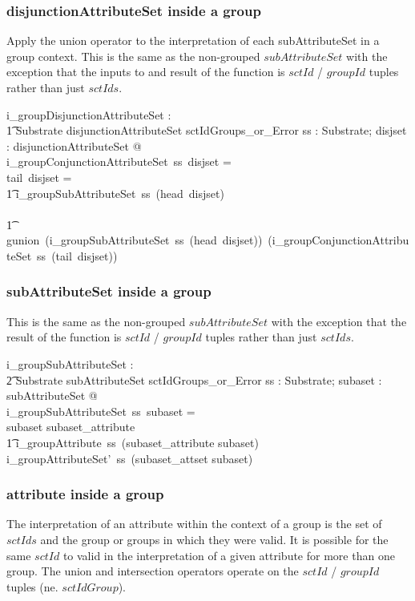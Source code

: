 \documentclass{article}
\begin{document}
\subsubsection{disjunctionAttributeSet inside a group}
Apply the union operator to the interpretation of each  subAttributeSet in a group context.  This is the same as the non-grouped $subAttributeSet$ with the exception that the inputs to and result of the function is $sctId$ / $groupId$ tuples rather than
just $sctIds$.


\begin{gendef}
    i\_groupDisjunctionAttributeSet : \\
\t1 Substrate \fun disjunctionAttributeSet \fun sctIdGroups\_or\_Error
\where
   \forall ss : Substrate;  disjset : disjunctionAttributeSet @ \\
   i\_groupConjunctionAttributeSet~ss~disjset = ~ \\
   \IF tail~disjset = \langle \rangle \THEN \\
   \t1  i\_groupSubAttributeSet~ss~(head~disjset) \\
\ELSE \\
\t1 gunion~(i\_groupSubAttributeSet~ss~(head~disjset))~(i\_groupConjunctionAttributeSet~ss~(tail~disjset))
\end{gendef}

\subsubsection{subAttributeSet inside a group}
This is the same as the non-grouped $subAttributeSet$ with the exception that the result of the function is $sctId$ / $groupId$ tuples rather than
just $sctIds$.


\begin{gendef}
   i\_groupSubAttributeSet : \\
\t2 Substrate \fun subAttributeSet \fun sctIdGroups\_or\_Error 
\where
   \forall ss : Substrate; subaset : subAttributeSet @ \\
   i\_groupSubAttributeSet~ss~subaset = \\
   \IF subaset \in \ran subaset\_attribute \\
\t1 \THEN i\_groupAttribute~ss~(subaset\_attribute \inv subaset) \\
  \ELSE i\_groupAttributeSet'~ss~(subaset\_attset \inv subaset)
\end{gendef}



\subsubsection{attribute inside a group}
The interpretation of an attribute within the context of a group is the set of $sctIds$ and the group or groups in which
they were valid.  It is possible for the same $sctId$ to valid in the interpretation of a given attribute for more than one group.
The union and intersection operators operate on the $sctId$ / $groupId$ tuples (ne. $sctIdGroup$).
\end{document}
